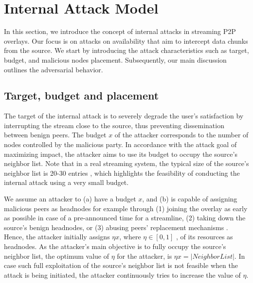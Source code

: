 \section{Internal Attack Model}
\label{sec:Attack}

In this section, we introduce the concept of internal attacks in streaming P2P overlays.
Our focus is on attacks on availability that aim to intercept data chunks from the source. 
We start by introducing the attack characteristics such as target, budget, and malicious nodes placement. 
Subsequently, our main discussion outlines the \drop adversarial behavior. 

\subsection{Target, budget and placement}


The target of the internal attack is to severely degrade the user's satisfaction by interrupting the stream close to the source, thus preventing dissemination between benign peers.
The budget $x$ of the attacker corresponds to the number of nodes controlled by the malicious party. 
In accordance with the attack goal of maximizing impact, the attacker aims to use its budget to occupy the source's neighbor list. 
Note that in a real streaming system, the typical size of the source's neighbor list is 20-30 entries \cite{neighborlist1,neighborlist2}, which highlights the feasibility of conducting the internal attack using a very small budget.

We assume an attacker to (a) have a budget $x$, and (b) is capable of assigning malicious peers as headnodes for example through (1) joining the overlay as early as possible in case of a pre-announced time for a streamline, (2) taking down the source's benign headnodes, or (3) abusing peers' replacement mechanisms \cite{nguyen2016swap}.
Hence, the attacker initially assigns $\eta x$, where $\eta\in [0,1]$ , of its resources as headnodes.
As the attacker's main objective is to fully occupy the source's neighbor list, the optimum value of $\eta$ for the attacker, is $\eta x = |NeighborList|$.
In case such full exploitation of the source's neighbor list is not feasible when the attack is being initiated, the attacker continuously tries to increase the value of $\eta$.  

